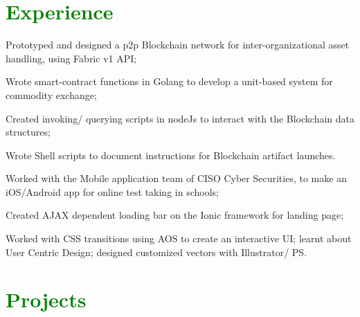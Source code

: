 \documentclass[letterpaper]{deedy-resume-openfont} %
\begin{document}
\begin{minipage}[t]{0.66\textwidth} %


\section{\textcolor{GREEN}{Experience}}

\vspace{\topsep} %
\begin{tightemize}
\item Prototyped and designed a p2p Blockchain network for inter-organizational asset handling, using Fabric v1 API;
\item Wrote smart-contract functions in Golang to develop a unit-based system for commodity exchange;
\item Created invoking/ querying scripts in nodeJs to interact with the Blockchain data structures;
\item Wrote Shell scripts to document instructions for Blockchain artifact launches.
\end{tightemize}

\sectionsep %

\begin{tightemize}
\item Worked with the Mobile application team of CISO Cyber Securities, to make an iOS/Android app for online test taking in schools;
\item Created AJAX dependent loading bar on the Ionic framework for landing page;
\item Worked with CSS transitions using AOS to create an interactive UI; learnt about User Centric Design; designed customized vectors with Illustrator/ PS.
\end{tightemize}



\section{\textcolor{GREEN}{Projects}}


\end{minipage}
\end{document}
